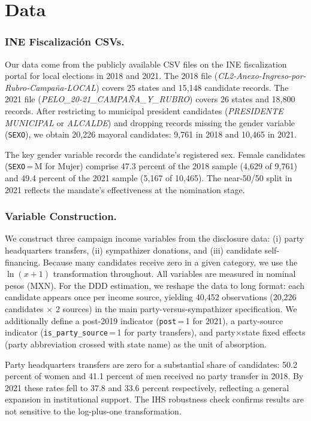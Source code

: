 \documentclass[12pt]{article}
\begin{document}
\section{Data}
\label{sec:data}

\subsubsection*{INE Fiscalizaci\'on CSVs.}
Our data come from the publicly available CSV files on the INE fiscalization portal for local elections in 2018 and 2021. The 2018 file (\textit{CL2-Anexo-Ingreso-por-Rubro-Campa\~na-LOCAL}) covers 25 states and 15,148 candidate records. The 2021 file (\textit{PELO\_20-21\_CAMPA\~NA\_Y\_RUBRO}) covers 26 states and 18,800 records. After restricting to municipal president candidates (\textit{PRESIDENTE MUNICIPAL} or \textit{ALCALDE}) and dropping records missing the gender variable (\texttt{SEXO}), we obtain 20,226 mayoral candidates: 9,761 in 2018 and 10,465 in 2021.

The key gender variable records the candidate's registered sex. Female candidates (\texttt{SEXO}\,=\,M for Mujer) comprise 47.3 percent of the 2018 sample (4,629 of 9,761) and 49.4 percent of the 2021 sample (5,167 of 10,465). The near-50/50 split in 2021 reflects the mandate's effectiveness at the nomination stage.

\subsubsection*{Variable Construction.}
We construct three campaign income variables from the disclosure data: (i) party headquarters transfers, (ii) sympathizer donations, and (iii) candidate self-financing. Because many candidates receive zero in a given category, we use the $\ln(x + 1)$ transformation throughout. All variables are measured in nominal pesos (MXN). For the DDD estimation, we reshape the data to long format: each candidate appears once per income source, yielding 40,452 observations (20,226 candidates $\times$ 2 sources) in the main party-versus-sympathizer specification. We additionally define a post-2019 indicator (\texttt{post}\,=\,1 for 2021), a party-source indicator (\texttt{is\_party\_source}\,=\,1 for party transfers), and party$\times$state fixed effects (party abbreviation crossed with state name) as the unit of absorption.

Party headquarters transfers are zero for a substantial share of candidates: 50.2 percent of women and 41.1 percent of men received no party transfer in 2018. By 2021 these rates fell to 37.8 and 33.6 percent respectively, reflecting a general expansion in institutional support. The IHS robustness check confirms results are not sensitive to the log-plus-one transformation.
\end{document}
